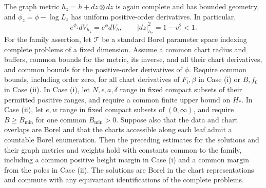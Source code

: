\begin{lemma}
The graph metric \(h_z=h+dz\otimes dz\) is again complete and has
bounded geometry, and \(\phi_z=\phi-\log L_z\) has uniform
positive-order derivatives.  In particular,
\[
 e^{\phi_z}dV_{h_z}=e^\phi dV_h,\qquad
 |dz|_{h_z}^2=1-v_z^2<1.
\]
For the family assertion, let \(\mathcal T\) be a standard Borel
parameter space indexing complete problems of a fixed dimension.
Assume a common chart radius and buffers, common bounds for the
metric, its inverse, and all their chart derivatives, and common
bounds for the positive-order derivatives of \(\phi\).  Require
common bounds, including order zero, for all chart derivatives of
\(F_i,\beta\) in Case \textup{(i)} or \(B,f_0\) in Case
\textup{(ii)}.  In Case \textup{(i)}, let \(N,\epsilon,a,\delta\)
range in fixed compact subsets of their permitted positive ranges,
and require a common finite upper bound on \(H_*\).  In Case
\textup{(ii)}, let \(e,w\) range in fixed compact subsets of
\((0,\infty)\), and require \(B\ge B_{\min}\) for one common
\(B_{\min}>0\).  Suppose also that the data and chart overlaps are
Borel and that the charts accessible along each leaf admit a
countable Borel enumeration.  Then the preceding estimates for the
solutions and their graph metrics and weights hold with constants common to the family,
including a common positive height margin in Case \textup{(i)}
and a common margin from the poles in Case \textup{(ii)}.  The
solutions are Borel in the chart representations and commute with
any equivariant identifications of the complete problems.
\end{lemma}

